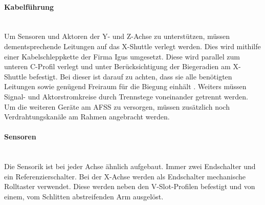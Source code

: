 \paragraph{Kabelführung} \mbox{}\\
Um Sensoren und Aktoren der Y- und Z-Achse zu unterstützen, müssen dementsprechende Leitungen auf das X-Shuttle verlegt werden. Dies wird mithilfe einer Kabelschleppkette der Firma Igus umgesetzt. Diese wird parallel zum unteren C-Profil verlegt und unter Berücksichtigung der Biegeradien am X-Shuttle befestigt. Bei dieser ist darauf zu achten, dass sie alle benötigten Leitungen sowie genügend Freiraum für die Biegung einhält \cite{igus_freitragend}. Weiters müssen Signal- und Aktorstromkreise durch Trennstege voneinander getrennt werden.
\\
Um die weiteren Geräte am AFSS zu versorgen, müssen zusätzlich noch Verdrahtungskanäle am Rahmen angebracht werden.

\paragraph{Sensoren}\mbox{}\\
Die Sensorik ist bei jeder Achse ähnlich aufgebaut. Immer zwei Endschalter und ein Referenzierschalter. Bei der X-Achse werden als Endschalter mechanische Rolltaster verwendet. Diese werden neben den V-Slot-Profilen befestigt und von einem, vom Schlitten abstreifenden Arm ausgelöst.


